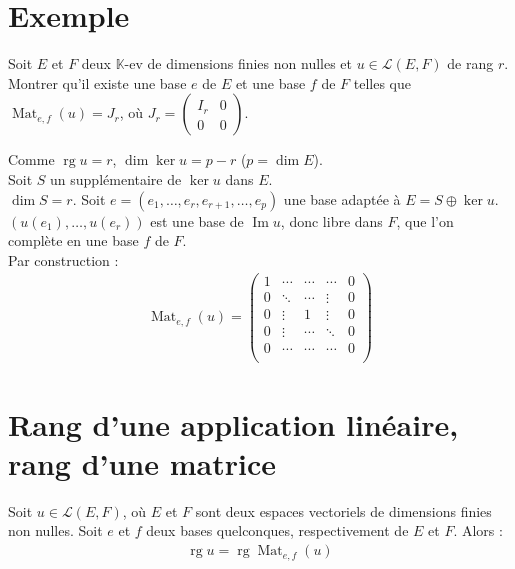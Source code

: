 \documentclass[../main.tex]{subfiles}
\begin{document}
\section{Exemple}
\begin{tcolorbox}[title=Exemple 28.29, title filled=false, colframe=darkgreen, colback=darkgreen!10!white]
    Soit $E$ et $F$ deux $\mathbb{K}$-ev de dimensions finies non nulles et $u\in \mathcal{L}(E, F)$ de rang $r$. \\
    Montrer qu'il existe une base $e$ de $E$ et une base $f$ de $F$ telles que $\operatorname{Mat}_{e,f}(u) = J_r$, où $J_r = \begin{pmatrix}
        I_r & 0 \\
        0 & 0
    \end{pmatrix}$. 
\end{tcolorbox}

\noindent Comme $\operatorname{rg} u = r$, $\dim \ker u = p - r$ ($p = \dim E$). \\
Soit $S$ un supplémentaire de $\ker u$ dans $E$. \\
$\dim S = r$. Soit $e = (e_1, \ldots, e_r, e_{r+1}, \ldots, e_p)$ une base adaptée à $E = S\oplus \ker u$. \\
$(u(e_1), \ldots, u(e_r))$ est une base de $\operatorname{Im} u$, donc libre dans $F$, que l'on complète en une base $f$ de $F$. \\
Par construction : 
\begin{align*}
    \operatorname{Mat}_{e,f}(u) = \begin{pmatrix}
        1 & \cdots & \cdots & \cdots & 0 \\
        0 & \ddots & \cdots & \vdots & 0 \\
        0 & \vdots & 1 & \vdots & 0 \\
        0 & \vdots & \cdots & \ddots & 0 \\
        0 & \cdots & \cdots & \cdots & 0 \\
    \end{pmatrix}
\end{align*}

\section{Rang d'une application linéaire, rang d'une matrice}
\begin{tcolorbox}[title=Propostion 28.33, title filled=false, colframe=lightblue, colback=lightblue!10!white]
    Soit $u\in \mathcal{L}(E, F)$, où $E$ et $F$ sont deux espaces vectoriels de dimensions finies non nulles. Soit $e$ et $f$ deux bases quelconques, respectivement de $E$ et $F$. Alors : 
    \begin{align*}
        \operatorname{rg} u = \operatorname{rg} \operatorname{Mat}_{e,f}(u)
    \end{align*}
\end{tcolorbox}
\end{document}
